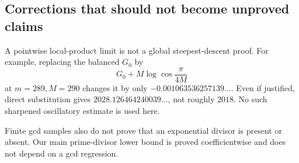 \subsection{Corrections that should not become unproved claims}

A pointwise local-product limit is not a global steepest-descent
proof. For example, replacing the balanced \(G_0\) by
\[
G_0+M\log\cos\frac{\pi}{4M}
\]
at \(m=289,M=290\) changes it by only
\(-0.001063536257139\ldots\).
Even if justified, direct substitution gives
\(2028.126464240039\ldots\), not roughly \(2018\).
No such sharpened oscillatory estimate is used here.

Finite gcd samples also do not prove that an exponential divisor
is present or absent. Our main prime-divisor lower bound is proved
coefficientwise and does not depend on a gcd regression.

